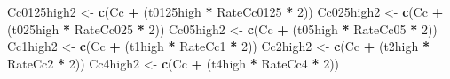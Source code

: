 \documentclass[
]{krantz}
\makeatletter
\newenvironment{Shaded}{\begin{snugshade}}{\end{snugshade}}
\newcommand{\DecValTok}[1]{\textcolor[rgb]{0.00,0.00,0.81}{#1}}
\newcommand{\KeywordTok}[1]{\textcolor[rgb]{0.13,0.29,0.53}{\textbf{#1}}}
\newcommand{\NormalTok}[1]{#1}
\newcommand{\OperatorTok}[1]{\textcolor[rgb]{0.81,0.36,0.00}{\textbf{#1}}}
\newcommand{\StringTok}[1]{\textcolor[rgb]{0.31,0.60,0.02}{#1}}
\newenvironment{kframe}{%
\medskip{}
\setlength{\fboxsep}{.8em}
 \def\at@end@of@kframe{}%
 \ifinner\ifhmode%
  \def\at@end@of@kframe{\end{minipage}}%
  \begin{minipage}{\columnwidth}%
 \fi\fi%
 \def\FrameCommand##1{\hskip\@totalleftmargin \hskip-\fboxsep
 \colorbox{shadecolor}{##1}\hskip-\fboxsep
     \hskip-\linewidth \hskip-\@totalleftmargin \hskip\columnwidth}%
 \MakeFramed {\advance\hsize-\width
   \@totalleftmargin\z@ \linewidth\hsize
   \@setminipage}}%
 {\par\unskip\endMakeFramed%
 \at@end@of@kframe}
\renewenvironment{Shaded}{\begin{kframe}}{\end{kframe}}
\makeatother
\begin{document}
\begin{Shaded}
\begin{Highlighting}[]
\NormalTok{Cc0125high2 <-}\StringTok{ }\KeywordTok{c}\NormalTok{(Cc }\OperatorTok{+}\StringTok{ }\NormalTok{(t0125high }\OperatorTok{*}\StringTok{ }\NormalTok{RateCc0125 }\OperatorTok{*}\StringTok{ }\DecValTok{2}\NormalTok{))}
\NormalTok{Cc025high2 <-}\StringTok{ }\KeywordTok{c}\NormalTok{(Cc }\OperatorTok{+}\StringTok{ }\NormalTok{(t025high }\OperatorTok{*}\StringTok{ }\NormalTok{RateCc025 }\OperatorTok{*}\StringTok{ }\DecValTok{2}\NormalTok{))}
\NormalTok{Cc05high2 <-}\StringTok{ }\KeywordTok{c}\NormalTok{(Cc }\OperatorTok{+}\StringTok{ }\NormalTok{(t05high }\OperatorTok{*}\StringTok{ }\NormalTok{RateCc05 }\OperatorTok{*}\StringTok{ }\DecValTok{2}\NormalTok{))}
\NormalTok{Cc1high2 <-}\StringTok{ }\KeywordTok{c}\NormalTok{(Cc }\OperatorTok{+}\StringTok{ }\NormalTok{(t1high }\OperatorTok{*}\StringTok{ }\NormalTok{RateCc1 }\OperatorTok{*}\StringTok{ }\DecValTok{2}\NormalTok{))}
\NormalTok{Cc2high2 <-}\StringTok{ }\KeywordTok{c}\NormalTok{(Cc }\OperatorTok{+}\StringTok{ }\NormalTok{(t2high }\OperatorTok{*}\StringTok{ }\NormalTok{RateCc2 }\OperatorTok{*}\StringTok{ }\DecValTok{2}\NormalTok{))}
\NormalTok{Cc4high2 <-}\StringTok{ }\KeywordTok{c}\NormalTok{(Cc }\OperatorTok{+}\StringTok{ }\NormalTok{(t4high }\OperatorTok{*}\StringTok{ }\NormalTok{RateCc4 }\OperatorTok{*}\StringTok{ }\DecValTok{2}\NormalTok{))}


\end{Highlighting}
\end{Shaded}
\end{document}
